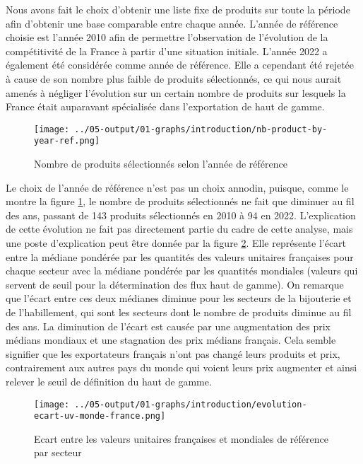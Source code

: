 \documentclass[french,10pt,a4paper]{article}
\begin{document}
Nous avons fait le choix d'obtenir une liste fixe de produits sur toute la période afin d'obtenir une base comparable entre chaque année. L'année de référence choisie est l'année 2010 afin de permettre l'observation de l'évolution de la compétitivité de la France à partir d'une situation initiale. L'année 2022 a également été considérée comme année de référence. Elle a cependant été rejetée à cause de son nombre plus faible de produits sélectionnés, ce qui nous aurait amenés à négliger l'évolution sur un certain nombre de produits sur lesquels la France était auparavant spécialisée dans l'exportation de haut de gamme. 

\begin{figure}[!h]
  \centering \texttt{[image: ../05-output/01-graphs/introduction/nb-product-by-year-ref.png]}
  \caption{Nombre de produits sélectionnés selon l'année de référence}
  \label{fig:nb-product-by-year-ref}
\end{figure}

Le choix de l'année de référence n'est pas un choix annodin, puisque, comme le montre la figure \ref{fig:nb-product-by-year-ref}, le nombre de produits sélectionnés ne fait que diminuer au fil des ans, passant de 143 produits sélectionnés en 2010 à 94 en 2022. L'explication de cette évolution ne fait pas directement partie du cadre de cette analyse, mais une poste d'explication peut être donnée par la figure \ref{fig:evolution-ecart-uv-monde-france}. Elle représente l'écart entre la médiane pondérée par les quantités des valeurs unitaires françaises pour chaque secteur avec la médiane pondérée par les quantités mondiales (valeurs qui servent de seuil pour la détermination des flux haut de gamme). On remarque que l'écart entre ces deux médianes diminue pour les secteurs de la bijouterie et de l'habillement, qui sont les secteurs dont le nombre de produits diminue au fil des ans. La diminution de l'écart est causée par une augmentation des prix médians mondiaux et une stagnation des prix médians français. Cela semble signifier que les exportateurs français n'ont pas changé leurs produits et prix, contrairement aux autres pays du monde qui voient leurs prix augmenter et ainsi relever le seuil de définition du haut de gamme.

\begin{figure}[!h]
  \centering \texttt{[image: ../05-output/01-graphs/introduction/evolution-ecart-uv-monde-france.png]}
  \caption{Ecart entre les valeurs unitaires françaises et mondiales de référence par secteur}
  \label{fig:evolution-ecart-uv-monde-france}
\end{figure}
\end{document}
